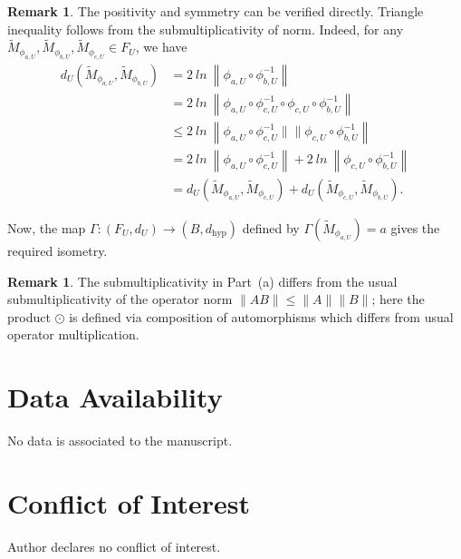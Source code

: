 \documentclass[12pt]{amsart}
\theoremstyle{definition}
\newtheorem{remark}[theorem]{Remark}
\begin{document}
\begin{remark}
The positivity and symmetry can be verified directly. Triangle inequality follows from the submultiplicativity of norm. Indeed, for any $\widetilde{M}_{\phi_{a,U}},\widetilde{M}_{\phi_{b,U}},\widetilde{M}_{\phi_{c,U}}\in F_U$, we have
\begin{align*}
d_U(\widetilde{M}_{\phi_{a,U}},\widetilde{M}_{\phi_{b,U}}) & = 2~ln~\left\|\phi_{a,U}\circ\phi_{b,U}^{-1}\right\|\\
& = 2~ln~\left\|\phi_{a,U}\circ{\phi_{c,U}^{-1}}\circ \phi_{c,U}\circ \phi_{b,U}^{-1}\right\|\\
& \leq 2~ln~\left\|\phi_{a,U}\circ{\phi_{c,U}^{-1}}\|\|\phi_{c,U}\circ \phi_{b,U}^{-1}\right\|\\
& = 2~ln~\left\|\phi_{a,U}\circ{\phi_{c,U}^{-1}}\right\| + 2~ln~\left\|\phi_{c,U}\circ \phi_{b,U}^{-1}\right\|\\
& = d_U(\widetilde{M}_{\phi_{a,U}},\widetilde{M}_{\phi_{c,U}})
+ d_U(\widetilde{M}_{\phi_{c,U}},\widetilde{M}_{\phi_{b,U}}).
\end{align*}

\medskip

\noindent Now, the map $\Gamma: (F_U,d_U)\to(B,d_{\mathrm{hyp}})$ defined by $\Gamma(\widetilde{M}_{\phi_{a,U}}) = a$ gives the required isometry.
\end{remark}






 
\begin{remark}
The submultiplicativity in Part~(a) differs from the usual submultiplicativity of the operator norm $\|AB\|\leq\|A\|\|B\|$; here the product $\odot$ is defined via composition of automorphisms which differs from usual operator multiplication.
\end{remark}

\section{Data Availability}

No data is associated to the manuscript.

\section{Conflict of Interest}

Author declares no conflict of interest.
\end{document}
